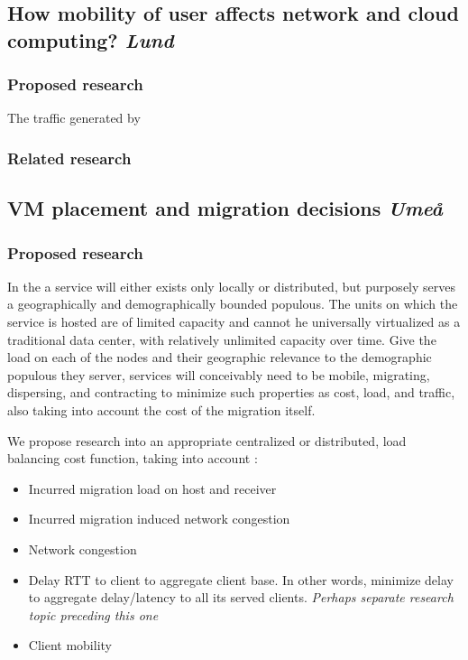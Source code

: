 \subsection{How mobility of user affects network and cloud computing? \emph{Lund}}
\subsubsection{Proposed research}
The traffic generated by 
\subsubsection{Related research}


\subsection{VM placement and migration decisions \emph{Umeå}}
\subsubsection{Proposed research}
In the \xcloud a service will either exists only locally or distributed, but purposely serves a geographically and demographically bounded populous. The units on which the service is hosted are of limited capacity and cannot he universally virtualized as a traditional data center, with relatively unlimited capacity over time. Give the load on each of the nodes and their geographic relevance to the demographic populous they server, services will conceivably need to be mobile, migrating, dispersing, and contracting to minimize such properties as cost, load, and traffic, also taking into account the cost of the migration itself.

We propose research into an appropriate centralized or distributed, load balancing cost function, taking into account :

\begin{itemize}
\item Incurred migration load on host and receiver
\item Incurred migration induced network congestion
\item Network congestion
\item Delay \/ RTT to client to aggregate client base. In other words, minimize delay to aggregate delay/latency to all its served clients. \emph{Perhaps separate research topic preceding this one}
\item Client mobility
\end{itemize}

